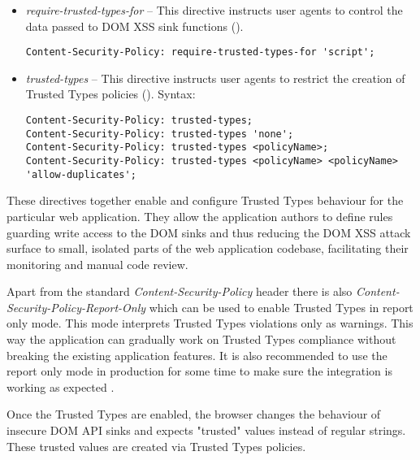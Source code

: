 \begin{itemize}
  \item \textit{require-trusted-types-for} -- This directive instructs user agents to control the
        data passed to DOM XSS sink functions (\cite{mdn:require-trusted-types-for}).

        \bigskip
        \begin{lstlisting}[language={}, caption=Syntax of require-trusted-types-for directive]
Content-Security-Policy: require-trusted-types-for 'script';\end{lstlisting}

  \item \textit{trusted-types} -- This directive instructs user agents to restrict the creation of
        Trusted Types policies (\cite{mdn:trusted-types}). Syntax:

        \bigskip
        \begin{lstlisting}[language={}, caption=Syntax of trusted-types directive]
Content-Security-Policy: trusted-types;
Content-Security-Policy: trusted-types 'none';
Content-Security-Policy: trusted-types <policyName>;
Content-Security-Policy: trusted-types <policyName> <policyName> 'allow-duplicates';\end{lstlisting}

\end{itemize}

These directives together enable and configure Trusted Types behaviour for the particular web
application. They allow the application authors to define rules guarding write access to the DOM
sinks and thus reducing the DOM XSS attack surface to small, isolated parts of the web application
codebase, facilitating their monitoring and manual code review.

Apart from the standard \textit{Content-Security-Policy} header there is also
\textit{Content-Security-Policy-Report-Only} which can be used to enable Trusted Types in report
only mode. This mode interprets Trusted Types violations only as warnings. This way the application
can gradually work on Trusted Types compliance without breaking the existing application features.
It is also recommended to use the report only mode in production for some time to make sure the
integration is working as expected \cite{tt_web_framework_paper}.

Once the Trusted Types are enabled, the browser changes the behaviour of insecure DOM API sinks and
expects "trusted" values instead of regular strings. These trusted values are created via Trusted
Types policies.

